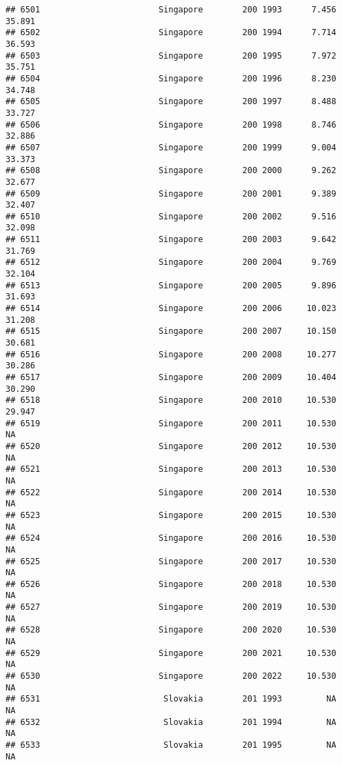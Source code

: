 \documentclass[
]{article}
\begin{document}
\begin{verbatim}
## 6501                        Singapore        200 1993      7.456     35.891
## 6502                        Singapore        200 1994      7.714     36.593
## 6503                        Singapore        200 1995      7.972     35.751
## 6504                        Singapore        200 1996      8.230     34.748
## 6505                        Singapore        200 1997      8.488     33.727
## 6506                        Singapore        200 1998      8.746     32.886
## 6507                        Singapore        200 1999      9.004     33.373
## 6508                        Singapore        200 2000      9.262     32.677
## 6509                        Singapore        200 2001      9.389     32.407
## 6510                        Singapore        200 2002      9.516     32.098
## 6511                        Singapore        200 2003      9.642     31.769
## 6512                        Singapore        200 2004      9.769     32.104
## 6513                        Singapore        200 2005      9.896     31.693
## 6514                        Singapore        200 2006     10.023     31.208
## 6515                        Singapore        200 2007     10.150     30.681
## 6516                        Singapore        200 2008     10.277     30.286
## 6517                        Singapore        200 2009     10.404     30.290
## 6518                        Singapore        200 2010     10.530     29.947
## 6519                        Singapore        200 2011     10.530         NA
## 6520                        Singapore        200 2012     10.530         NA
## 6521                        Singapore        200 2013     10.530         NA
## 6522                        Singapore        200 2014     10.530         NA
## 6523                        Singapore        200 2015     10.530         NA
## 6524                        Singapore        200 2016     10.530         NA
## 6525                        Singapore        200 2017     10.530         NA
## 6526                        Singapore        200 2018     10.530         NA
## 6527                        Singapore        200 2019     10.530         NA
## 6528                        Singapore        200 2020     10.530         NA
## 6529                        Singapore        200 2021     10.530         NA
## 6530                        Singapore        200 2022     10.530         NA
## 6531                         Slovakia        201 1993         NA         NA
## 6532                         Slovakia        201 1994         NA         NA
## 6533                         Slovakia        201 1995         NA         NA

\end{verbatim}
\end{document}
